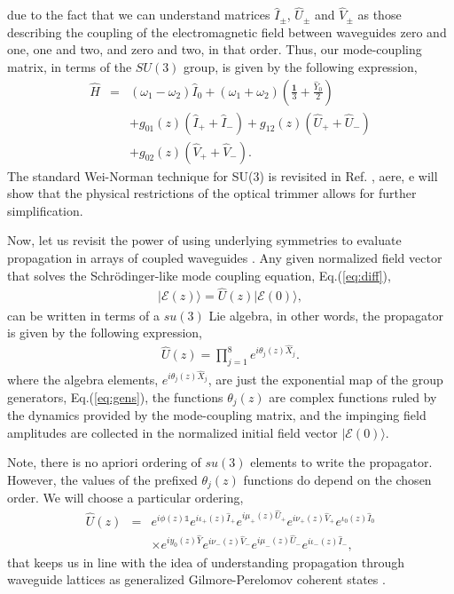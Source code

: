 \documentclass[9pt,twocolumn,twoside]{osajnl}
\begin{document}
due to the fact that we can understand matrices $\hat{I}_{\pm}$, $\hat{U}_{\pm}$ and $\hat{V}_{\pm}$ as those describing the coupling of the electromagnetic field between waveguides zero and one, one and two, and zero and two, in that order.
Thus, our mode-coupling matrix, in terms of the $SU(3)$ group, is given by the following expression,
\begin{eqnarray}
	\hat{H} &=& 
	(\omega_1 - \omega_2) \hat{I}_{0}
	+(\omega_1 + \omega_2) 
	(\frac{\mathbf{1}}{3} + \frac{\hat{Y}_{0}}{2})
	\nonumber \\
	&&+g_{01}(z) \left( \hat{I}_{+} + \hat{I}_{-} \right) + g_{12}(z) \left( \hat{U}_{+} + \hat{U}_{-} \right)\nonumber \\
	 & & +  g_{02}(z) \left( \hat{V}_{+} + \hat{V}_{-} \right).
\end{eqnarray}
The standard Wei-Norman technique for SU(3) is revisited in Ref. \cite{Dattoli1987p1582}, aere, e will show that the physical restrictions of the optical trimmer allows for further simplification.

Now, let us revisit the power of using underlying symmetries to evaluate propagation in arrays of coupled waveguides \cite{VillanuevaVergara2015p}. 
Any given normalized field vector that solves the Schr\"odinger-like mode coupling equation, Eq.(\ref{eq:diff}), 
\begin{eqnarray}
	\vert \mathcal{E}(z) \rangle = \hat{U}(z)  \vert 	\mathcal{E}(0) \rangle, \label{eq:sol}
\end{eqnarray}
can be written in terms of a $su(3)$ Lie algebra, in other words, the propagator is given by the following expression, 
\begin{eqnarray}
	\hat{U}(z) = \prod_{j=1}^{8} e^{i \theta_{j}(z) \hat{X}_{j}}.
\end{eqnarray}
where the algebra elements, $e^{i \theta_{j}(z) \hat{X}_{j}}$, are just the exponential map of the group generators, Eq.(\ref{eq:gens}), the functions $\theta_{j}(z)$ are complex functions ruled by the dynamics provided by the mode-coupling matrix, and the impinging field amplitudes are collected in the normalized initial field vector $\vert \mathcal{E}(0) \rangle$.

Note, there is no apriori ordering of $su(3)$ elements to write the propagator. 
However, the values of the prefixed $\theta_{j}(z)$ functions do depend on the chosen order.
We will choose a particular ordering,
\begin{eqnarray}
\hat{U}(z) &=& e^{i \phi(z)\mathbb{1} }e^{i \iota_{+}(z) \hat{I}_{+}} e^{i \mu_{+}(z) \hat{U}_{+}}  
e^{i \nu_{+}(z) \hat{V}_{+}} e^{ \iota_{0}(z) \hat{I}_{0}} \nonumber \\ 
&& \times e^{i y_{0}(z) \hat{Y}}  e^{i \nu_{-}(z) \hat{V}_{-}} e^{i \mu_{-}(z) \hat{U}_{-}} e^{i \iota_{-}(z) \hat{I}_{-}}, \label{eq:prop}
\end{eqnarray}
that keeps us in line with the idea of understanding propagation through waveguide lattices as generalized Gilmore-Perelomov coherent states \cite{VillanuevaVergara2015p}.
\end{document}
